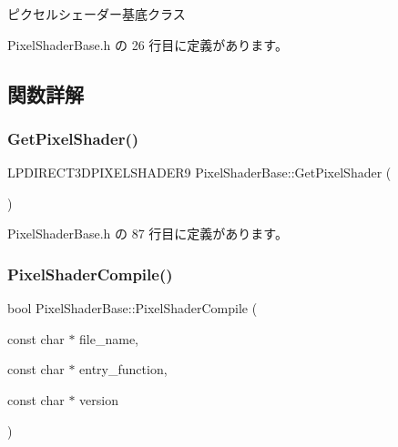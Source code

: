 ピクセルシェーダー基底クラス 

 Pixel\+Shader\+Base.\+h の 26 行目に定義があります。



\subsection{関数詳解}
\mbox{\label{class_pixel_shader_base_a936a4a1e99488854ffdd4cc245134481}} 
\subsubsection{\texorpdfstring{Get\+Pixel\+Shader()}{GetPixelShader()}}
{\footnotesize\ttfamily L\+P\+D\+I\+R\+E\+C\+T3\+D\+P\+I\+X\+E\+L\+S\+H\+A\+D\+E\+R9 Pixel\+Shader\+Base\+::\+Get\+Pixel\+Shader (\begin{DoxyParamCaption}{ }\end{DoxyParamCaption})\hspace{0.3cm}{\ttfamily [inline]}}



 Pixel\+Shader\+Base.\+h の 87 行目に定義があります。

\mbox{\label{class_pixel_shader_base_ac572f1cb13a4486fc8bc2e60e5a14dc4}} 
\subsubsection{\texorpdfstring{Pixel\+Shader\+Compile()}{PixelShaderCompile()}}
{\footnotesize\ttfamily bool Pixel\+Shader\+Base\+::\+Pixel\+Shader\+Compile (\begin{DoxyParamCaption}\item[{const char $\ast$}]{file\+\_\+name,  }\item[{const char $\ast$}]{entry\+\_\+function,  }\item[{const char $\ast$}]{version }\end{DoxyParamCaption})\hspace{0.3cm}{\ttfamily [inline]}}



